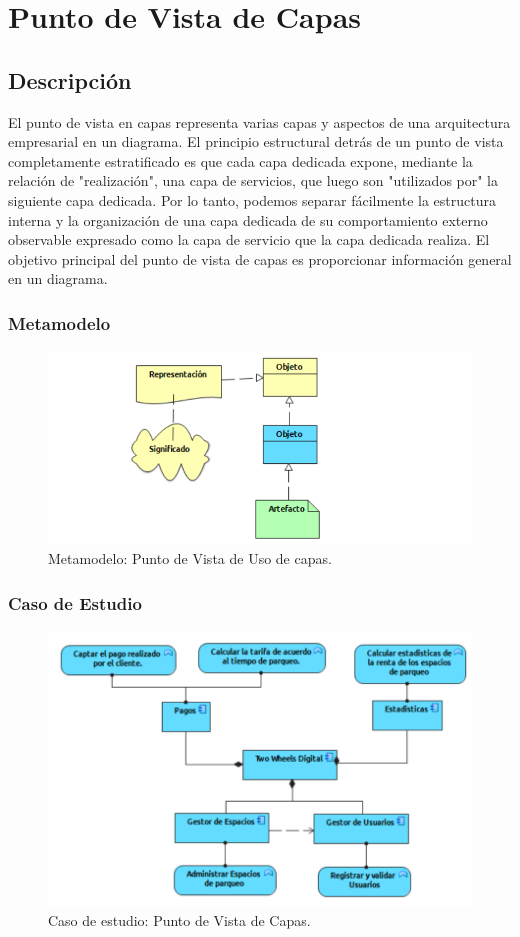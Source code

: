 \section{Punto de Vista de Capas}
\subsection{Descripción}
El punto de vista en capas representa varias capas y aspectos de una arquitectura empresarial en un diagrama. El principio estructural detrás de un punto de vista completamente estratificado es que cada capa dedicada expone, mediante la relación de "realización", una capa de servicios, que luego son "utilizados por" la siguiente capa dedicada. Por lo tanto, podemos separar fácilmente la estructura interna y la organización de una capa dedicada de su comportamiento externo observable expresado como la capa de servicio que la capa dedicada realiza.  El objetivo principal del punto de vista de capas es proporcionar información general en un diagrama.

\subsubsection{Metamodelo}
\begin{figure}[H]
	\centering
	\includegraphics[width=1.0\textwidth]{imagenes/Metamodelos/Tecnologia/Estructura_informacion.PDF}
	\caption{Metamodelo: Punto de Vista de Uso de capas.}
	\label{fig:gap_analysis}
\end{figure}

\subsubsection{Caso de Estudio}


\begin{figure}[H]
	\centering
	\includegraphics[width=1.0\textwidth]{imagenes/Caso_Estudio/Tecnologia/ComAplicacion.PDF}
	\caption{Caso de estudio: Punto de Vista de Capas.}
	\label{fig:gap_analysis}
\end{figure}

